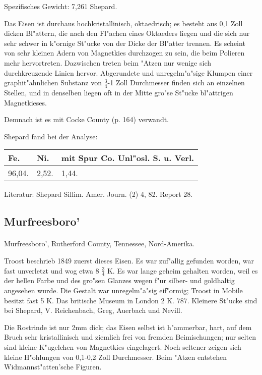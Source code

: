 \documentclass[a4paper, 11pt, oneside]{article}
\begin{document}
Spezifisches Gewicht: 7,261 Shepard.

Das Eisen ist durchaus hochkristallinisch, oktaedrisch; es besteht aus 0,1 Zoll dicken Bl"attern, die nach den Fl"achen eines Oktaeders liegen und die sich nur sehr schwer in k"ornige St"ucke von der Dicke der Bl"atter trennen. Es scheint von sehr kleinen Adern von Magnetkies durchzogen zu sein, die beim Polieren mehr hervortreten. Dazwischen treten beim "Atzen nur wenige sich durchkreuzende Linien hervor. Abgerundete und unregelm"a"sige Klumpen einer graphit"ahnlichen Substanz von $\frac{3}{4}$-1 Zoll Durchmesser finden sich an einzelnen Stellen, und in denselben liegen oft in der Mitte gro"se St"ucke bl"attrigen Magnetkieses.

Demnach ist es mit Cocke County (p. 164) verwandt.

Shepard fand bei der Analyse:
\begin{table}[H]
    \centering
    \begin{tabular}{l l l}
        Fe. & Ni. & mit Spur Co. Unl"osl. S. u. Verl. \\ \hline
        96,04. & 2,52. & 1,44. \\
    \end{tabular}
\end{table}

\footnotesize
Literatur: Shepard Sillim. Amer. Journ. (2) 4, 82. Report 28.

\subsection{Murfreesboro'}
\normalsize
\paragraph{}
Murfreesboro', Rutherford County, Tennessee, Nord-Amerika.

Troost beschrieb 1849 zuerst dieses Eisen. Es war zuf"allig gefunden worden, war fast unverletzt und wog etwa 8 $\frac{3}{4}$ K. Es war lange geheim gehalten worden, weil es der hellen Farbe und des gro"sen Glanzes wegen f"ur silber- und goldhaltig angesehen wurde. Die Gestalt war unregelm"a"sig eif"ormig; Troost in Mobile besitzt fast 5 K. Das britische Museum in London 2 K. 787. Kleinere St"ucke sind bei Shepard, V. Reichenbach, Greg, Auerbach und Nevill.

Die Rostrinde ist nur 2mm dick; das Eisen selbst ist h"ammerbar, hart, auf dem Bruch sehr kristallinisch und ziemlich frei von fremden Beimischungen; nur selten sind kleine K"ugelchen von Magnetkies eingelagert. Noch seltener zeigen sich kleine H"ohlungen von 0,1-0,2 Zoll Durchmesser. Beim "Atzen entstehen Widmannst"atten'sche Figuren.
\end{document}
